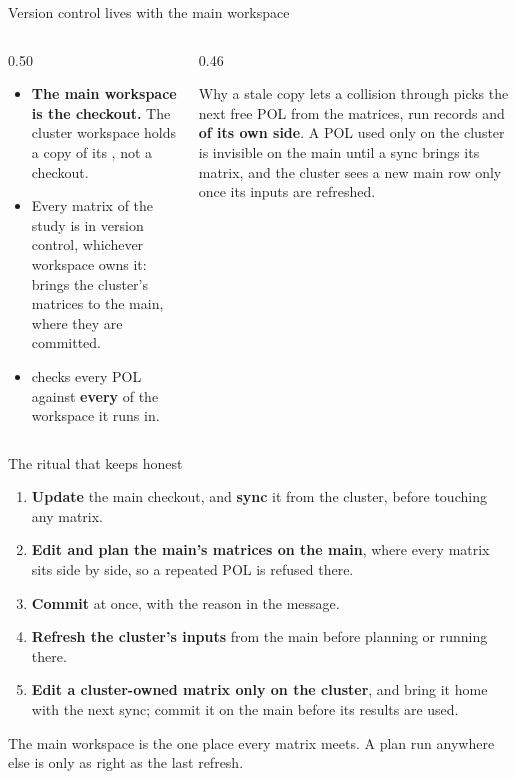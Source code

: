 \begin{frame}{Version control lives with the main workspace}
\begin{columns}[T]
\begin{column}{0.50\textwidth}
\begin{itemize}\small
  \item \textbf{The main workspace is the checkout.} The cluster workspace
        holds a copy of its , not a checkout.
  \item Every matrix of the study is in version control, whichever workspace
        owns it:  brings the cluster's matrices to the main, where
        they are committed.
  \item {} checks every POL against \textbf{every}  of the
        workspace it runs in.
\end{itemize}
\end{column}
\begin{column}{0.46\textwidth}
\begin{alertblock}{Why a stale copy lets a collision through}
\small {} picks the next free POL from the matrices, run
records and  \textbf{of its own side}. A POL used only on the
cluster is invisible on the main until a sync brings its matrix, and the
cluster sees a new main row only once its inputs are refreshed.
\end{alertblock}
\end{column}
\end{columns}
\end{frame}

\begin{frame}{The ritual that keeps  honest}
\begin{enumerate}\small
  \item \textbf{Update} the main checkout, and \textbf{sync} it from the
        cluster, before touching any matrix.
  \item \textbf{Edit and plan the main's matrices on the main}, where every
        matrix sits side by side, so a repeated POL is refused there.
  \item \textbf{Commit} at once, with the reason in the message.
  \item \textbf{Refresh the cluster's inputs} from the main before planning
        or running there.
  \item \textbf{Edit a cluster-owned matrix only on the cluster}, and bring it
        home with the next sync; commit it on the main before its results are
        used.
\end{enumerate}
\begin{takeaway}The main workspace is the one place every matrix meets. A plan
run anywhere else is only as right as the last refresh.\end{takeaway}
\end{frame}


